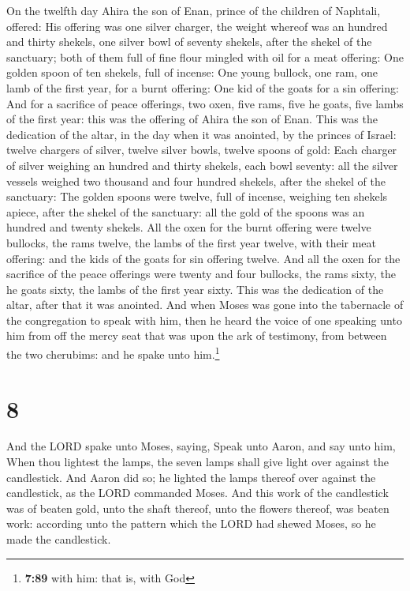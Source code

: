 On the twelfth day Ahira the son of Enan, prince of the
children of Naphtali, offered:  His offering was one
silver charger, the weight whereof was an hundred and thirty shekels,
one silver bowl of seventy shekels, after the shekel of the sanctuary;
both of them full of fine flour mingled with oil for a meat offering:
 One golden spoon of ten shekels, full of incense:
 One young bullock, one ram, one lamb of the first year,
for a burnt offering:  One kid of the goats for a sin
offering:  And for a sacrifice of peace offerings, two
oxen, five rams, five he goats, five lambs of the first year: this was
the offering of Ahira the son of Enan.  This was the
dedication of the altar, in the day when it was anointed, by the princes
of Israel: twelve chargers of silver, twelve silver bowls, twelve spoons
of gold:  Each charger of silver weighing an hundred and
thirty shekels, each bowl seventy: all the silver vessels weighed two
thousand and four hundred shekels, after the shekel of the sanctuary:
 The golden spoons were twelve, full of incense, weighing
ten shekels apiece, after the shekel of the sanctuary: all the gold of
the spoons was an hundred and twenty shekels.  All the
oxen for the burnt offering were twelve bullocks, the rams twelve, the
lambs of the first year twelve, with their meat offering: and the kids
of the goats for sin offering twelve.  And all the oxen
for the sacrifice of the peace offerings were twenty and four bullocks,
the rams sixty, the he goats sixty, the lambs of the first year sixty.
This was the dedication of the altar, after that it was anointed.
 And when Moses was gone into the tabernacle of the
congregation to speak with him, then he heard the voice of one speaking
unto him from off the mercy seat that was upon the ark of testimony,
from between the two cherubims: and he spake unto him.\footnote{\textbf{7:89}
  with him: that is, with God}

\hypertarget{section-7}{%
\section{8}\label{section-7}}

 And the LORD spake unto Moses, saying, 
Speak unto Aaron, and say unto him, When thou lightest the lamps, the
seven lamps shall give light over against the candlestick.
 And Aaron did so; he lighted the lamps thereof over
against the candlestick, as the LORD commanded Moses.  And
this work of the candlestick was of beaten gold, unto the shaft thereof,
unto the flowers thereof, was beaten work: according unto the pattern
which the LORD had shewed Moses, so he made the candlestick.


